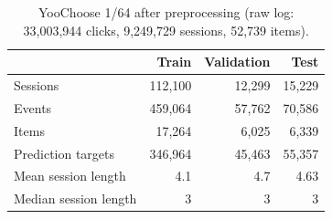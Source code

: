 \begin{table}[H]
\caption{YooChoose 1/64 after preprocessing (raw log: 33,003,944 clicks, 9,249,729 sessions, 52,739 items).}
\label{tab:yc_stats}
\begin{tabular}{lrrr}
\toprule
 & Train & Validation & Test \\
\midrule
Sessions & 112,100 & 12,299 & 15,229 \\
Events & 459,064 & 57,762 & 70,586 \\
Items & 17,264 & 6,025 & 6,339 \\
Prediction targets & 346,964 & 45,463 & 55,357 \\
Mean session length & 4.1 & 4.7 & 4.63 \\
Median session length & 3 & 3 & 3 \\
\bottomrule
\end{tabular}
\end{table}
